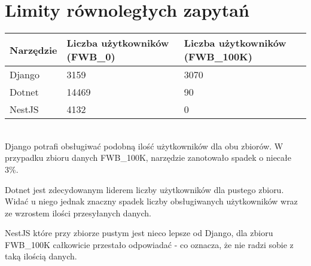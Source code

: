 \section{Limity równoległych zapytań}


\begin{tabular}{ | m{7em} | m{15em} | m{18em} | } 
    \hline
    Narzędzie & Liczba użytkowników (\textbf{FWB\_0}) & Liczba użytkowników (\textbf{FWB\_100K}) \\ 
    \hline
    Django & 3159 & 3070 \\ 
    \hline
    Dotnet & 14469 & 90 \\ 
    \hline
    NestJS & 4132 & 0 \\ 
    \hline
\end{tabular}
\phantom
\\

Django potrafi obsługiwać podobną ilość użytkowników dla obu zbiorów. 
W przypadku zbioru danych FWB\_100K, narzędzie zanotowało spadek o niecałe 3\%.

Dotnet jest zdecydowanym liderem liczby użytkowników dla pustego zbioru. 
Widać u niego jednak znaczny spadek liczby obsługiwanych użytkowników wraz ze wzrostem ilości przesyłanych danych.

NestJS które przy zbiorze pustym jest nieco lepsze od Django, dla zbioru FWB\_100K całkowicie przestało odpowiadać - co oznacza, że nie radzi sobie z taką ilością danych.

